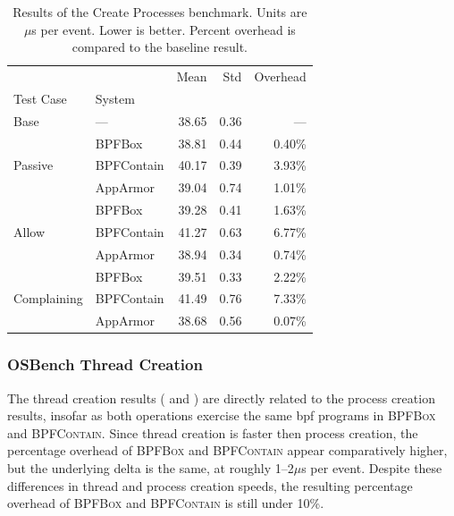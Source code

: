 \documentclass[
  fontsize=12pt,
  titlepage=firstiscover,
  paper=letter,
oneside,
  cleardoublepage=plain,
  parskip=half-,
  DIV=10,
  parindent,
  appendixprefix,
  chapterprefix,
  listof=totoc,
]{scrbook}
\newcommand{\bpfbox}{\textsc{BPFBox}}
\newcommand{\bpfcontain}{\textsc{BPFContain}}
\begin{document}
\begin{table}[ht!]
\centering
\footnotesize
\caption[Results of the Create Processes benchmark]{Results of the Create Processes benchmark. Units are $\mu$s per event. Lower is better. Percent overhead is compared to the baseline result.}
\label{tab:phoronix-create-processes}
\begin{tabular}{llrrr}
\toprule
            &          &   Mean &   Std & Overhead \\
Test Case & System &        &       &          \\
\midrule
Base & --- &  38.65 &  0.36 &      --- \\
\cline{1-5}
\multirow{3}{*}{Passive} & BPFBox &  38.81 &  0.44 &   0.40\% \\
            & BPFContain &  40.17 &  0.39 &   3.93\% \\
            & AppArmor &  39.04 &  0.74 &   1.01\% \\
\cline{1-5}
\multirow{3}{*}{Allow} & BPFBox &  39.28 &  0.41 &   1.63\% \\
            & BPFContain &  41.27 &  0.63 &   6.77\% \\
            & AppArmor &  38.94 &  0.34 &   0.74\% \\
\cline{1-5}
\multirow{3}{*}{Complaining} & BPFBox &  39.51 &  0.33 &   2.22\% \\
            & BPFContain &  41.49 &  0.76 &   7.33\% \\
            & AppArmor &  38.68 &  0.56 &   0.07\% \\
\bottomrule
\end{tabular}
\end{table}
 
\FloatBarrier



\subsubsection{OSBench Thread Creation}

The thread creation results ( and )
are directly related to the process creation results, insofar as both operations exercise
the same \gls{bpf} programs in \bpfbox{} and \bpfcontain{}. Since thread creation is
faster then process creation, the percentage overhead of \bpfbox{} and \bpfcontain{}
appear comparatively higher, but the underlying delta is the same, at roughly 1--2$\mu$s
per event. Despite these differences in thread and process creation speeds, the resulting
percentage overhead of \bpfbox{} and \bpfcontain{} is still under 10\%.
\end{document}
